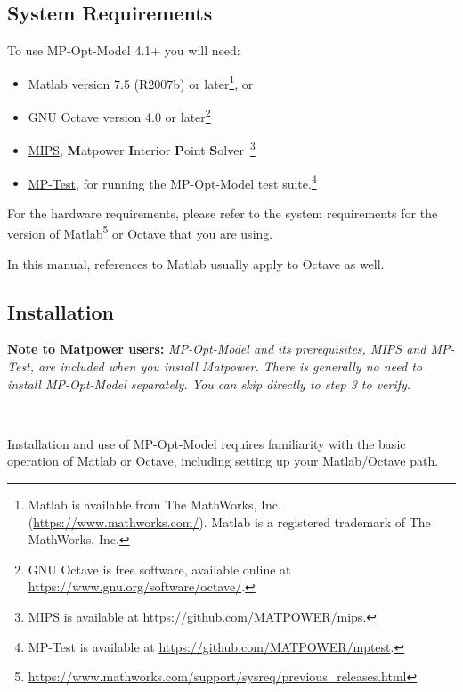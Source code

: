 \documentclass[12pt]{article}
\newcommand{\matlab}[0]{{\sc Matlab}}
\newcommand{\matpower}[0]{{\sc Matpower}}
\newcommand{\mptest}[0]{{MP-Test}}
\newcommand{\mptesturl}[0]{https://github.com/MATPOWER/mptest}
\newcommand{\mptestlink}[0]{\href{\mptesturl}{\mptest{}}}
\newcommand{\mips}[0]{{MIPS}}
\newcommand{\mipsurl}[0]{https://github.com/MATPOWER/mips}
\newcommand{\mipslink}[0]{\href{\mipsurl}{\mips{}}}
\newcommand{\mipsname}[0]{{{\bf M}{\sc atpower} \textbf{I}nterior \textbf{P}oint \textbf{S}olver}}
\newcommand{\mpom}[0]{\mbox{MP-Opt-Model}}
\newcommand{\mpomver}[0]{4.1+}
\numberwithin{equation}{section}
\numberwithin{table}{section}
\numberwithin{figure}{section}
\begin{document}
\subsection{System Requirements}
\label{sec:sysreq}
To use \mpom{} \mpomver{} you will need:
\begin{itemize}
\item \matlab{}\textsuperscript{\tiny \textregistered} version 7.5 (R2007b) or later\footnote{\matlab{} is available from The MathWorks, Inc. (\url{https://www.mathworks.com/}). \matlab{} is a registered trademark of The MathWorks, Inc.}, or
\item GNU Octave version 4.0 or later\footnote{GNU Octave \cite{octave} is free software, available online at \url{https://www.gnu.org/software/octave/}.}
\item \mipslink{}, \mipsname{}~\cite{wang2007a, mips_manual}\footnote{\mips{} is available at \url{\mipsurl}.}
\item \mptestlink{}, for running the \mpom{} test suite.\footnote{\mptest{} is available at \url{\mptesturl}.}
\end{itemize}

For the hardware requirements, please refer to the system requirements for the version of \matlab{}\footnote{\url{https://www.mathworks.com/support/sysreq/previous_releases.html}} or Octave that you are using.

In this manual, references to \matlab{} usually apply to Octave as well.

\subsection{Installation}
\label{sec:installation}

{\bf Note to \matpower{} users:} \emph{\mpom{} and its prerequisites, \mips{} and \mptest{}, are included when you install \matpower{}. There is generally no need to install \mpom{} separately. You can skip directly to step 3 to verify.}

~

Installation and use of \mpom{} requires familiarity with the basic operation of \matlab{} or Octave, including setting up your \matlab{}/Octave path.
\end{document}
